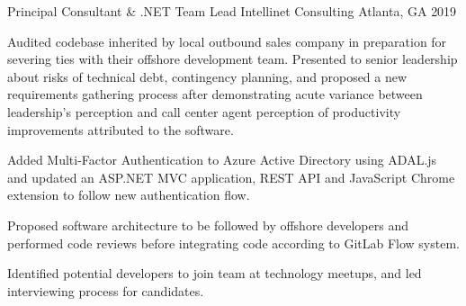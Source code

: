 \begin{cventries}
  \cventry
    {Principal Consultant \& .NET Team Lead} %
    {Intellinet Consulting} %
    {Atlanta, GA} %
    {2019} %
    {
      \begin{cvitems} %
        \item {Audited codebase inherited by local outbound sales company in preparation for severing ties with their offshore development team. Presented to senior leadership about risks of technical debt, contingency planning, and proposed a new requirements gathering process after demonstrating acute variance between leadership’s perception and call center agent perception of productivity improvements attributed to the software.}
        \item {Added Multi-Factor Authentication to Azure Active Directory using ADAL.js and updated an ASP.NET MVC application, REST API and JavaScript Chrome extension to follow new authentication flow.}
        \item {Proposed software architecture to be followed by offshore developers and performed code reviews before integrating code according to GitLab Flow system.}
        \item {Identified potential developers to join team at technology meetups, and led interviewing process for candidates.}
      \end{cvitems}
    }


\end{cventries}

